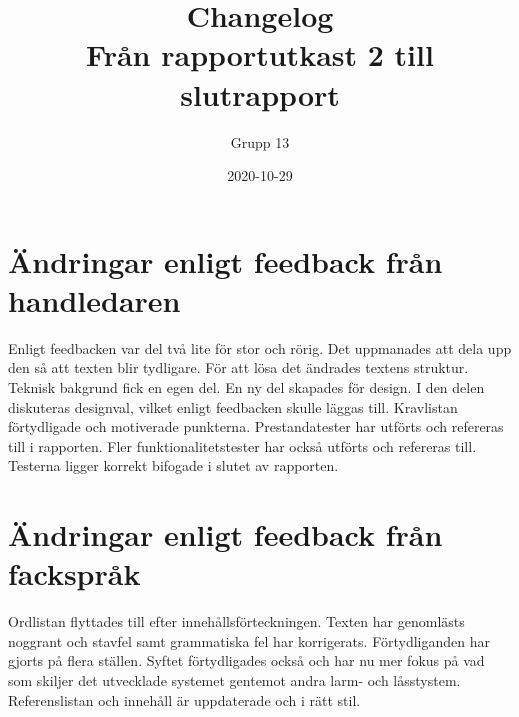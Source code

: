 \documentclass[a4paper]{article}
\begin{document}
\title{
  Changelog \\
  \large Från rapportutkast 2 till slutrapport}
\date{2020-10-29}

\author{ Grupp 13}

\maketitle
\thispagestyle{empty}
\newpage
\thispagestyle{empty}
\newpage

\section*{Ändringar enligt feedback från handledaren}
Enligt feedbacken var del två lite för stor och rörig. Det uppmanades att dela upp den så att texten blir tydligare. För att lösa det ändrades textens struktur. Teknisk bakgrund fick en egen del. En ny del skapades för design. I den delen diskuteras designval, vilket enligt feedbacken skulle läggas till.
Kravlistan förtydligade och motiverade punkterna.
\newline\newline
Prestandatester har utförts och refereras till i rapporten. Fler funktionalitetstester har också utförts och refereras till.
Testerna ligger korrekt bifogade i slutet av rapporten.

\section*{Ändringar enligt feedback från fackspråk}
Ordlistan flyttades till efter innehållsförteckningen.
Texten har genomlästs noggrant och stavfel samt grammatiska fel har korrigerats.
Förtydliganden har gjorts på flera ställen.
Syftet förtydligades också och har nu mer fokus på vad som skiljer det utvecklade systemet gentemot andra larm- och låsstystem.
Referenslistan och innehåll är uppdaterade och i rätt stil.
\end{document}
